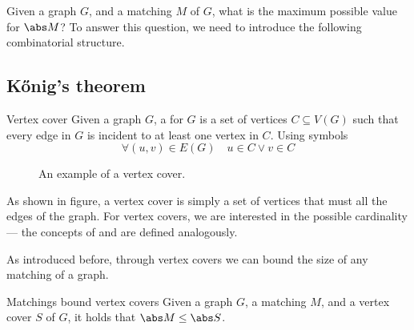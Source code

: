 \documentclass[a4paper, 12pt]{report}
\begin{document}
    Given a graph $G$, and a matching $M$ of $G$, what is the maximum possible value for $\abs M$? To answer this question, we need to introduce the following combinatorial structure.

    \subsection{Kőnig's theorem}

    \begin{frameddefn}{Vertex cover}
        Given a graph $G$, a  for $G$ is a set of vertices $C \subseteq V(G)$ such that every edge in $G$ is incident to at least one vertex in $C$. Using symbols $$\forall (u, v) \in E(G) \quad u \in C \lor v \in C$$
    \end{frameddefn}

    \begin{figure}[H]
        \centering
        \caption{An example of a vertex cover.}
    \end{figure}
    
    As shown in figure, a vertex cover is simply a set of vertices that must  all the edges of the graph. For vertex covers, we are interested in the  possible cardinality --- the concepts of  and  are defined analogously.

    As introduced before, through vertex covers we can bound the size of any matching of a graph.

    \begin{framedthm}{Matchings bound vertex covers}
        Given a graph $G$, a matching $M$, and a vertex cover $S$ of $G$, it holds that $\abs M \le \abs S$.
    \end{framedthm}
\end{document}

